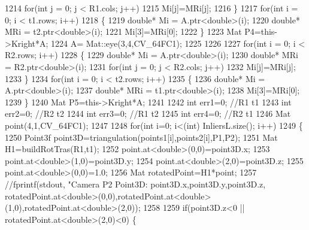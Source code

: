 \begin{DoxyCode}
1214         \textcolor{keywordflow}{for}(\textcolor{keywordtype}{int} j = 0; j < R1.cols; j++)
1215             Mi[j]=MRi[j];
1216     \}
1217     \textcolor{keywordflow}{for}(\textcolor{keywordtype}{int} i = 0; i < t1.rows; i++)
1218     \{
1219         \textcolor{keywordtype}{double}* Mi = A.ptr<\textcolor{keywordtype}{double}>(i);
1220         \textcolor{keywordtype}{double}* MRi = t2.ptr<\textcolor{keywordtype}{double}>(i);
1221         Mi[3]=MRi[0];
1222     \}
1223     Mat P4=this->Kright*A;
1224     A= Mat::eye(3,4,CV\_64FC1);
1225 
1226 
1227     \textcolor{keywordflow}{for}(\textcolor{keywordtype}{int} i = 0; i < R2.rows; i++)
1228     \{
1229         \textcolor{keywordtype}{double}* Mi = A.ptr<\textcolor{keywordtype}{double}>(i);
1230         \textcolor{keywordtype}{double}* MRi = R2.ptr<\textcolor{keywordtype}{double}>(i);
1231         \textcolor{keywordflow}{for}(\textcolor{keywordtype}{int} j = 0; j < R2.cols; j++)
1232             Mi[j]=MRi[j];
1233     \}
1234     \textcolor{keywordflow}{for}(\textcolor{keywordtype}{int} i = 0; i < t2.rows; i++)
1235     \{
1236         \textcolor{keywordtype}{double}* Mi = A.ptr<\textcolor{keywordtype}{double}>(i);
1237         \textcolor{keywordtype}{double}* MRi = t1.ptr<\textcolor{keywordtype}{double}>(i);
1238         Mi[3]=MRi[0];
1239     \}
1240     Mat P5=this->Kright*A;
1241 
1242     \textcolor{keywordtype}{int} err1=0; \textcolor{comment}{//R1 t1}
1243     \textcolor{keywordtype}{int} err2=0; \textcolor{comment}{//R2 t2}
1244     \textcolor{keywordtype}{int} err3=0; \textcolor{comment}{//R1 t2}
1245     \textcolor{keywordtype}{int} err4=0; \textcolor{comment}{//R2 t1}
1246     Mat point(4,1,CV\_64FC1);
1247 
1248     \textcolor{keywordflow}{for}(\textcolor{keywordtype}{int} i=0; i<(int) InliersL.size(); i++)
1249     \{
1250         Point3f point3D=triangulation(points1[i],points2[i],P1,P2);
1251         Mat H1=buildRotTras(R1,t1);
1252         point.at<\textcolor{keywordtype}{double}>(0,0)=point3D.x;
1253         point.at<\textcolor{keywordtype}{double}>(1,0)=point3D.y;
1254         point.at<\textcolor{keywordtype}{double}>(2,0)=point3D.z;
1255         point.at<\textcolor{keywordtype}{double}>(0,0)=1.0;
1256         Mat rotatedPoint=H1*point;
1257         \textcolor{comment}{//fprintf(stdout, "Camera P2 Point3D: %
       point3D.x,point3D.y,point3D.z, rotatedPoint.at<double>(0,0),rotatedPoint.at<double>(1,0),rotatedPoint.at<double>(2,0));}
1258 
1259         \textcolor{keywordflow}{if}(point3D.z<0 || rotatedPoint.at<\textcolor{keywordtype}{double}>(2,0)<0) \{

\end{DoxyCode}
